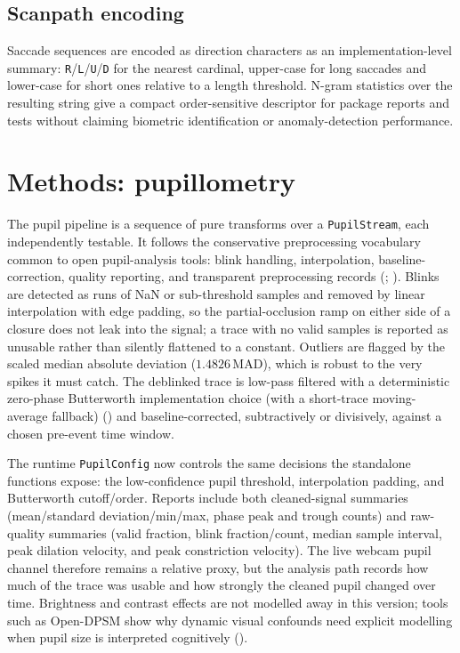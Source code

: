 \documentclass[
]{article}
\begin{document}
\subsection{Scanpath encoding}\label{scanpath-encoding}

Saccade sequences are encoded as direction characters as an
implementation-level summary:
\texttt{R}/\texttt{L}/\texttt{U}/\texttt{D} for the nearest cardinal,
upper-case for long saccades and lower-case for short ones relative to a
length threshold. N-gram statistics over the resulting string give a
compact order-sensitive descriptor for package reports and tests without
claiming biometric identification or anomaly-detection performance.

\section{Methods: pupillometry}\label{sec:pupillometry}

The pupil pipeline is a sequence of pure transforms over a
\texttt{PupilStream}, each independently testable. It follows the
conservative preprocessing vocabulary common to open pupil-analysis
tools: blink handling, interpolation, baseline-correction, quality
reporting, and transparent preprocessing records
(;
). Blinks are
detected as runs of NaN or sub-threshold samples and removed by linear
interpolation with edge padding, so the partial-occlusion ramp on either
side of a closure does not leak into the signal; a trace with no valid
samples is reported as unusable rather than silently flattened to a
constant. Outliers are flagged by the scaled median absolute deviation
(\(1.4826\,\mathrm{MAD}\)), which is robust to the very spikes it must
catch. The deblinked trace is low-pass filtered with a deterministic
zero-phase Butterworth implementation choice (with a short-trace
moving-average fallback)
() and
baseline-corrected, subtractively or divisively, against a chosen
pre-event time window.

The runtime \texttt{PupilConfig} now controls the same decisions the
standalone functions expose: the low-confidence pupil threshold,
interpolation padding, and Butterworth cutoff/order. Reports include
both cleaned-signal summaries (mean/standard deviation/min/max, phase
peak and trough counts) and raw-quality summaries (valid fraction, blink
fraction/count, median sample interval, peak dilation velocity, and peak
constriction velocity). The live webcam pupil channel therefore remains
a relative proxy, but the analysis path records how much of the trace
was usable and how strongly the cleaned pupil changed over time.
Brightness and contrast effects are not modelled away in this version;
tools such as Open-DPSM show why dynamic visual confounds need explicit
modelling when pupil size is interpreted cognitively
().
\end{document}
